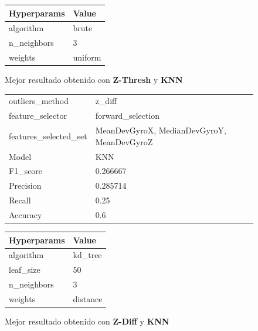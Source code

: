 \begin{appendices}
\begin{figure}[htb]
			\begin{tabular}{ll}
				\toprule
				Hyperparams &   Value \\
				\midrule
				  algorithm &   brute \\
				n\_neighbors &       3 \\
					weights & uniform \\
				\bottomrule
			\end{tabular}
			\caption{Mejor resultado obtenido con \textbf{Z-Thresh} y \textbf{KNN}}
			\label{table:14}
		\end{figure}

		\begin{figure}[htb]
			\centering
			\begin{tabular}{ll}
				\toprule
					  outliers\_method &                                       z\_diff \\
					 feature\_selector &                            forward\_selection \\
				features\_selected\_set & {MeanDevGyroX, MedianDevGyroY, MeanDevGyroZ} \\
								Model &                                          KNN \\
						F1\_score &                                     0.266667 \\
					   Precision &                                     0.285714 \\
						  Recall &                                         0.25 \\
						Accuracy &                                          0.6 \\
				\bottomrule
			\end{tabular}
			\newline
			\newline

			\begin{tabular}{ll}
				\toprule
				Hyperparams &    Value \\
				\midrule
				  algorithm &  kd\_tree \\
				  leaf\_size &       50 \\
				n\_neighbors &        3 \\
					weights & distance \\
				\bottomrule
			\end{tabular}
			\caption{Mejor resultado obtenido con \textbf{Z-Diff} y \textbf{KNN}}
			\label{table:15}
		\end{figure}


\end{appendices}
